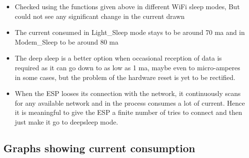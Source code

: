 \documentclass[16pt]{article}
\begin{document}
\begin{itemize}

\item
  Checked using the functions given above in different WiFi sleep modes,
  But could not see any significant change in the current drawn
\item
  The current consumed in Light\_Sleep mode stays to be around 70 ma and
  in Modem\_Sleep to be aroun\vspace{0.5cm}d 80 ma
\item
  The deep sleep is a better option when occasional reception of data is
  required as it can go down to as low as 1 ma, maybe even to
  micro-amperes in some cases, but the problem of the hardware reset is
  yet to be rectified.
\item
  When the ESP looses its connection with the network, it continuously
  scans for any available network and in the process consumes a lot of
  current. Hence it is meaningful to give the ESP a finite number of
  tries to connect and then just make it go to deepsleep mode.
\end{itemize}


\vspace{0.5cm}
\subsection{Graphs showing current
consumption}
\end{document}
